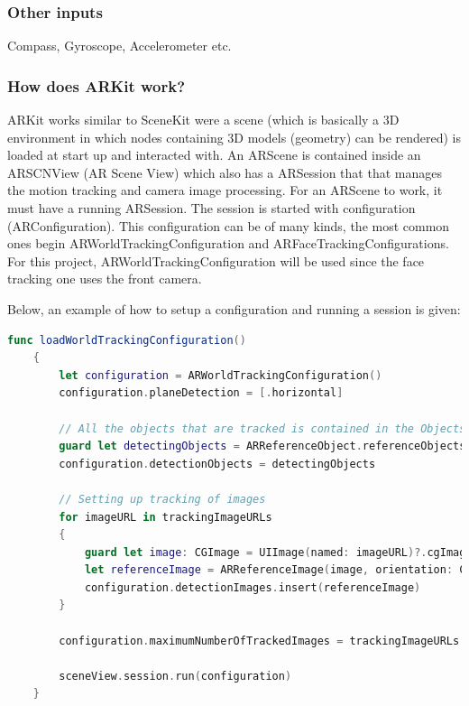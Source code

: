 \subsubsection{Other inputs}
Compass, Gyroscope, Accelerometer  etc.

\subsubsection{How does ARKit work?}
ARKit works similar to SceneKit were a scene (which is basically a 3D environment in which nodes containing 3D models (geometry) can be rendered) is loaded at start up and interacted with.
An ARScene is contained inside an ARSCNView (AR Scene View) which also has a ARSession
that that manages the motion tracking and camera image processing. For an ARScene to work, it must have a running ARSession.
The session is started with configuration (ARConfiguration). This configuration can be of many kinds, the most common ones begin ARWorldTrackingConfiguration and ARFaceTrackingConfigurations. For this project, ARWorldTrackingConfiguration will be used since the face tracking one uses the front camera.

Below, an example of how to setup a configuration and running a session is given:

\begin{lstlisting}[language=swift]
func loadWorldTrackingConfiguration()
    {
        let configuration = ARWorldTrackingConfiguration()
        configuration.planeDetection = [.horizontal]

        // All the objects that are tracked is contained in the Objects folder
        guard let detectingObjects = ARReferenceObject.referenceObjects(inGroupNamed: "Objects", bundle: nil) else { return }
        configuration.detectionObjects = detectingObjects
        
        // Setting up tracking of images
        for imageURL in trackingImageURLs
        {
            guard let image: CGImage = UIImage(named: imageURL)?.cgImage else { return }
            let referenceImage = ARReferenceImage(image, orientation: CGImagePropertyOrientation.up, physicalWidth: 0.3)
            configuration.detectionImages.insert(referenceImage)
        }

        configuration.maximumNumberOfTrackedImages = trackingImageURLs.count
        
        sceneView.session.run(configuration)
    }
\end{lstlisting}

